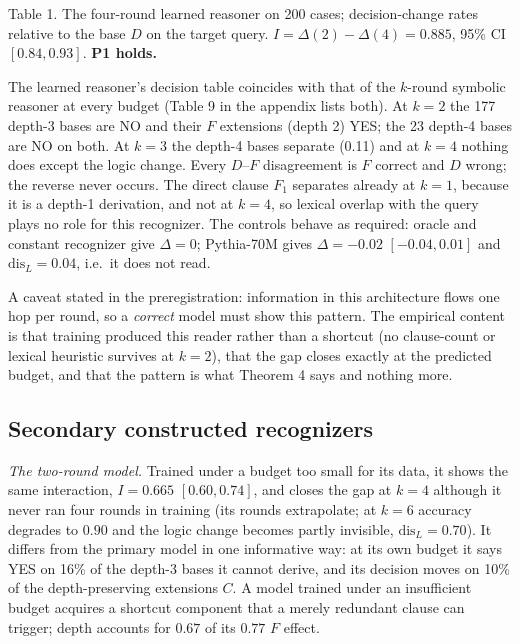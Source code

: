 Table 1. The four-round learned reasoner on 200 cases; decision-change rates relative to the base \(D\) on the target query. \(I=\Delta(2)-\Delta(4)=0.885\), 95\% CI \([0.84,0.93]\). \textbf{P1 holds.}

The learned reasoner's decision table coincides with that of the \(k\)-round symbolic reasoner at every budget (Table 9 in the appendix lists both). At \(k=2\) the 177 depth-3 bases are NO and their \(F\) extensions (depth 2) YES; the 23 depth-4 bases are NO on both. At \(k=3\) the depth-4 bases separate (0.11) and at \(k=4\) nothing does except the logic change. Every \(D\)--\(F\) disagreement is \(F\) correct and \(D\) wrong; the reverse never occurs. The direct clause \(F_1\) separates already at \(k=1\), because it is a depth-1 derivation, and not at \(k=4\), so lexical overlap with the query plays no role for this recognizer. The controls behave as required: oracle and constant recognizer give \(\Delta=0\); Pythia-70M gives \(\Delta=-0.02\) \([-0.04,0.01]\) and \(\mathrm{dis}_L=0.04\), i.e.~it does not read.

A caveat stated in the preregistration: information in this architecture flows one hop per round, so a \emph{correct} model must show this pattern. The empirical content is that training produced this reader rather than a shortcut (no clause-count or lexical heuristic survives at \(k=2\)), that the gap closes exactly at the predicted budget, and that the pattern is what Theorem 4 says and nothing more.

\subsection{Secondary constructed recognizers}\label{secondary-constructed-recognizers}

\emph{The two-round model.} Trained under a budget too small for its data, it shows the same interaction, \(I=0.665\) \([0.60,0.74]\), and closes the gap at \(k=4\) although it never ran four rounds in training (its rounds extrapolate; at \(k=6\) accuracy degrades to \(0.90\) and the logic change becomes partly invisible, \(\mathrm{dis}_L=0.70\)). It differs from the primary model in one informative way: at its own budget it says YES on 16\% of the depth-3 bases it cannot derive, and its decision moves on 10\% of the depth-preserving extensions \(C\). A model trained under an insufficient budget acquires a shortcut component that a merely redundant clause can trigger; depth accounts for \(0.67\) of its \(0.77\) \(F\) effect.

